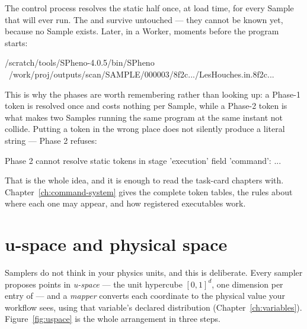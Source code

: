 \begin{terminal}
\end{terminal}

The control process resolves the static half once, at load time, for every Sample that
will ever run. The  and  survive untouched --- they cannot
be known yet, because no Sample exists. Later, in a Worker, moments before the program
starts:

\begin{terminal}
\begin{jcmd}
/scratch/tools/SPheno-4.0.5/bin/SPheno \
  /work/proj/outputs/scan/SAMPLE/000003/8f2c.../LesHouches.in.8f2c...
\end{jcmd}
\end{terminal}

This is why the phases are worth remembering rather than looking up: a Phase-1 token is
resolved once and costs nothing per Sample, while a Phase-2 token is what makes two
Samples running the same program at the same instant not collide. Putting a token in the
wrong place does not silently produce a literal string --- Phase 2 refuses:

\begin{terminal}
\begin{jout}
Phase 2 cannot resolve static tokens in stage 'execution' field 'command': ...
\end{jout}
\end{terminal}

That is the whole idea, and it is enough to read the task-card chapters with.
Chapter~\ref{ch:command-system} gives the complete token tables, the rules about where
each one may appear, and how registered executables work.

\section{u-space and physical space}
\label{sec:uspace}

Samplers do not think in your physics units, and this is deliberate. Every sampler
proposes points in \emph{u-space} --- the unit hypercube $[0,1]^d$, one dimension per
entry of \yamlkey{Sampling.Variables} --- and a \emph{mapper} converts each coordinate to
the physical value your workflow sees, using that variable's declared distribution
(Chapter~\ref{ch:variables}). Figure~\ref{fig:uspace} is the whole arrangement in three
steps.

